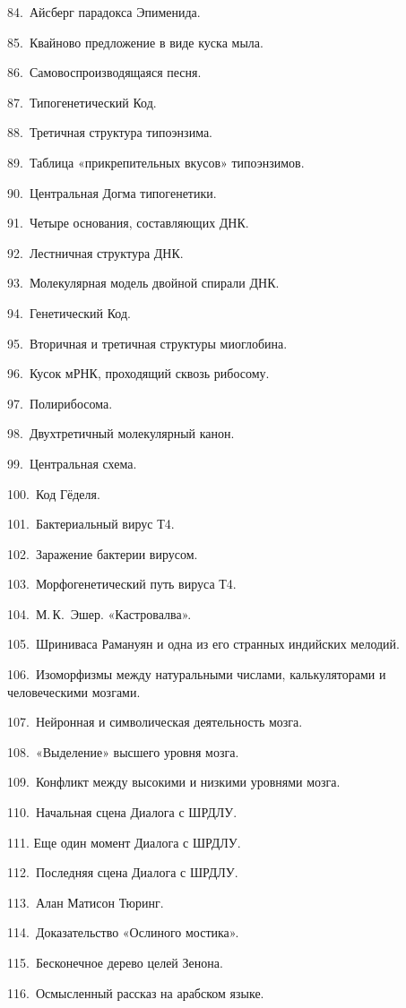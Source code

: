 \documentclass[../main.tex]{subfiles}
\begin{document}
84.~Айсберг парадокса Эпименида.

85.~Квайново предложение в виде куска мыла.

86.~Самовоспроизводящаяся песня.

87.~Типогенетический Код.

88.~Третичная структура типоэнзима.

89.~Таблица «прикрепительных вкусов» типоэнзимов.

90.~Центральная Догма типогенетики.

91.~Четыре основания, составляющих ДНК.

92.~Лестничная структура ДНК.

93.~Молекулярная модель двойной спирали ДНК.

94.~Генетический Код.

95.~Вторичная и третичная структуры миоглобина.

96.~Кусок мРНК, проходящий сквозь рибосому.

97.~Полирибосома.

98.~Двухтретичный молекулярный канон.

99.~Центральная схема.

100.~Код Гёделя.

101.~Бактериальный вирус Т4.

102.~Заражение бактерии вирусом.

103.~Морфогенетический путь вируса Т4.

104.~М.\,К.~Эшер. «Кастровалва».

105.~Шриниваса Рамануян и одна из его странных индийских мелодий.

106.~Изоморфизмы между натуральными числами, калькуляторами и человеческими мозгами.

107.~Нейронная и символическая деятельность мозга.

108.~«Выделение» высшего уровня мозга.

109.~Конфликт между высокими и низкими уровнями мозга.

110.~Начальная сцена Диалога с ШРДЛУ.

111. Еще один момент Диалога с ШРДЛУ.

112.~Последняя сцена Диалога с ШРДЛУ.

113.~Алан Матисон Тюринг.

114.~Доказательство «Ослиного мостика».

115.~Бесконечное дерево целей Зенона.

116.~Осмысленный рассказ на арабском языке.
\end{document}
